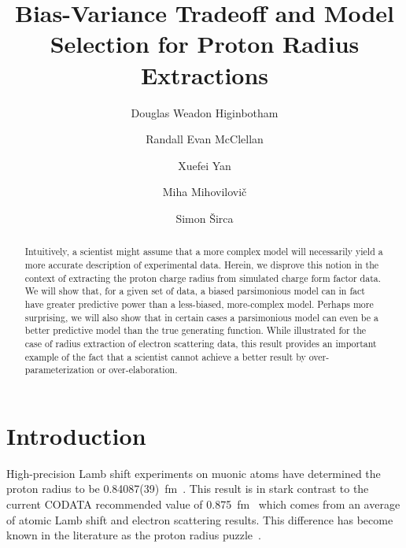 \documentclass[10pt,aps,prc,twocolumn]{revtex4-1}
\begin{document}
\title{Bias-Variance Tradeoff and Model Selection for Proton Radius Extractions}

\author{Douglas Weadon Higinbotham}
\author{Randall Evan McClellan}
\author{Xuefei Yan}
\author{Miha Mihovilovi\v{c}}
\author{Simon \v{S}irca}

\begin{abstract}
Intuitively, a scientist might assume that a more complex model will necessarily yield a more 
accurate description of experimental data.   Herein, we disprove this notion in the context of extracting 
the proton charge radius from simulated charge form factor data.  We will show that, for a given set of data, 
a biased parsimonious model can in fact have greater predictive power than a less-biased, more-complex model.  
Perhaps more surprising,
we will also show that in certain cases a parsimonious model can even be a better predictive model 
than the true generating function.   While illustrated for the case of radius extraction of electron scattering data,
this result provides an important example of the fact that a scientist cannot achieve a better result by
over-parameterization or over-elaboration.
\end{abstract}

\maketitle

\section{Introduction}

High-precision Lamb shift experiments on muonic atoms have determined the proton radius to 
be 0.84087(39)~fm~\cite{Pohl:2010zza,Antognini:1900ns}.   This result is in stark contrast to the current
CODATA recommended value of 0.875~fm~\cite{Mohr:2015ccw} which comes from an average of atomic 
Lamb shift and electron scattering results.    This difference has become known in the literature as
the proton radius puzzle~\cite{}.
\end{document}
